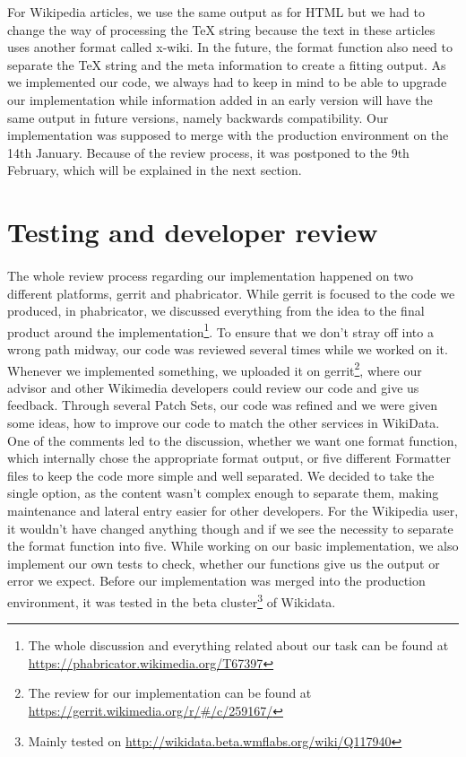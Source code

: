 \documentclass[12pt]{article}
\begin{document}
For Wikipedia articles, we use the same output as for HTML but we had to change the way of processing the TeX string because the text in these articles uses another format called x-wiki.
In the future, the format function also need to separate the TeX string and the meta information to create a fitting output.
As we implemented our code, we always had to keep in mind to be able to upgrade our implementation while information added in an early version will have the same output in future versions, namely backwards compatibility.
Our implementation was supposed to merge with the production environment on the 14th January. Because of the review process, it was postponed to the 9th February, which will be explained in the next section.

\section{Testing and developer review}
\paragraph{}
The whole review process regarding our implementation happened on two different platforms, gerrit and phabricator. While gerrit is focused to the code we produced, in phabricator, we discussed everything from the idea to the final product around the implementation\footnote{The whole discussion and everything related about our task can be found at \url{https://phabricator.wikimedia.org/T67397}}.
To ensure that we don't stray off into a wrong path midway, our code was reviewed several times while we worked on it.
Whenever we implemented something, we uploaded it on gerrit\footnote{The review for our implementation can be found at \url{https://gerrit.wikimedia.org/r/\#/c/259167/}}, where our advisor and other Wikimedia developers could review our code and give us feedback. Through several Patch Sets, our code was refined and we were given some ideas, how to improve our code to match the other services in WikiData. One of the comments led to the discussion, whether we want one format function, which internally chose the appropriate format output, or five different Formatter files to keep the code more simple and well separated. We decided to take the single option, as the content wasn't complex enough to separate them, making maintenance and lateral entry easier for other developers. For the Wikipedia user, it wouldn't have changed anything though and if we see the necessity to separate the format function into five.
While working on our basic implementation, we also implement our own tests to check, whether our functions give us the output or error we expect.
Before our implementation was merged into the production environment, it was tested in the beta cluster\footnote{Mainly tested on \url{http://wikidata.beta.wmflabs.org/wiki/Q117940}} of Wikidata.
\end{document}

